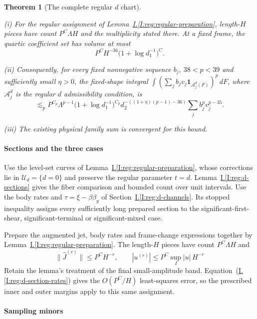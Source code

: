 \documentclass[11pt]{amsart}
\newtheorem{theorem}{Theorem}[section]
\theoremstyle{definition}
\theoremstyle{remark}
\numberwithin{equation}{section}
\newcommand{\partIref}[1]{\hyperref[I:#1]{I.\ref*{I:#1}}}
\newcommand{\partIeqref}[1]{\textup{(\partIref{#1})}}
\begin{document}
\begin{theorem}[The complete regular $d$ chart]\label{low:4:rd:theorem}

\noindent\textup{(i)} For the regular assignment of Lemma~\partIref{reg:regular-preparation}, length-$H$ pieces have count $P^C\Lambda H$ and the multiplicity stated there. At a fixed frame, the quartic coefficient set has volume at most
\[
P^C H^{-36}\bigl(1+\log d_1^{-1}\bigr)^C.
\]

\noindent\textup{(ii)} Consequently, for every fixed nonnegative sequence $b_j$, $38<p<39$ and sufficiently small $\eta>0$, the fixed-shape integral $\int(\sum_j b_jv_j\mathbf1_{\mathcal A_j^d(F)})^p\,dF$, where $\mathcal A_j^d$ is the regular $d$ admissibility condition, is
\[
\lesssim_p P^{C_p}\Lambda^{p-1}\bigl(1+\log d_1^{-1}\bigr)^{C_p}d_2^{-((1+\eta)(p-1)-36)}\sum_j b_j^pv_j^{p-35}.
\]

\noindent\textup{(iii)} The existing physical family sum is convergent for this bound.
\end{theorem}

\paragraph{Sections and the three cases}

Use the level-set curves of Lemma~\partIref{reg:regular-preparation}, whose corrections lie in $\mathcal U_d=\{d=0\}$ and preserve the regular parameter $t=d$. Lemma~\partIref{reg:d-sections} gives the fiber comparison and bounded count over unit intervals. Use the body rates and $\tau=\xi-\beta\beta_y$ of Section~\partIref{reg:d-channels}. Its stopped inequality assigns every sufficiently long prepared section to the significant-first-shear, significant-terminal or significant-mixed case.

Prepare the augmented jet, body rates and frame-change expressions together by Lemma~\partIref{reg:regular-preparation}. The length-$H$ pieces have count $P^C\Lambda H$ and
\begin{equation}\label{low:4:rd:preparation}
\|\widehat J^{(r)}\|\le P^C H^{-r},\qquad |u^{(r)}|\le P^C\sup_I|u|\,H^{-r}
\end{equation}
Retain the lemma's treatment of the final small-amplitude band. Equation~\partIeqref{reg:d-section-rates} gives the $O(P^C/H)$ least-squares error, so the prescribed inner and outer margins apply to this same assignment.

\paragraph{Sampling minors}
\end{document}
